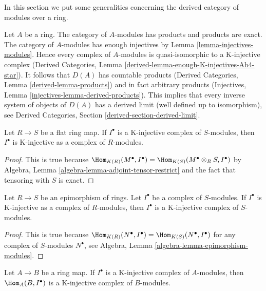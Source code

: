 \noindent
In this section we put some generalities concerning the
derived category of modules over a ring.

\medskip\noindent
Let $A$ be a ring. The category of $A$-modules has products and products are
exact. The category of $A$-modules has enough injectives by
Lemma \ref{lemma-injectives-modules}. Hence every complex of $A$-modules
is quasi-isomorphic to a K-injective complex
(Derived Categories, Lemma \ref{derived-lemma-enough-K-injectives-Ab4-star}).
It follows that $D(A)$ has countable products
(Derived Categories, Lemma \ref{derived-lemma-products})
and in fact arbitrary products
(Injectives, Lemma \ref{injectives-lemma-derived-products}).
This implies that every inverse system of objects of $D(A)$
has a derived limit (well defined up to isomorphism), see
Derived Categories, Section \ref{derived-section-derived-limit}.

\begin{lemma}
\label{lemma-K-injective-flat}
Let $R \to S$ be a flat ring map. If $I^\bullet$ is a K-injective
complex of $S$-modules, then $I^\bullet$ is K-injective as a
complex of $R$-modules.
\end{lemma}

\begin{proof}
This is true because
$\Hom_{K(R)}(M^\bullet, I^\bullet) =
\Hom_{K(S)}(M^\bullet \otimes_R S, I^\bullet)$
by Algebra, Lemma \ref{algebra-lemma-adjoint-tensor-restrict}
and the fact that tensoring with $S$ is exact.
\end{proof}

\begin{lemma}
\label{lemma-K-injective-epimorphism}
Let $R \to S$ be an epimorphism of rings. Let $I^\bullet$ be a complex
of $S$-modules. If $I^\bullet$ is K-injective as a complex of
$R$-modules, then $I^\bullet$ is a K-injective complex of $S$-modules.
\end{lemma}

\begin{proof}
This is true because
$\Hom_{K(R)}(N^\bullet, I^\bullet) =
\Hom_{K(S)}(N^\bullet, I^\bullet)$ for any complex of $S$-modules
$N^\bullet$,
see Algebra, Lemma \ref{algebra-lemma-epimorphism-modules}.
\end{proof}

\begin{lemma}
\label{lemma-hom-K-injective}
Let $A \to B$ be a ring map. If $I^\bullet$ is a K-injective complex of
$A$-modules, then $\Hom_A(B, I^\bullet)$ is a K-injective complex of
$B$-modules.
\end{lemma}

